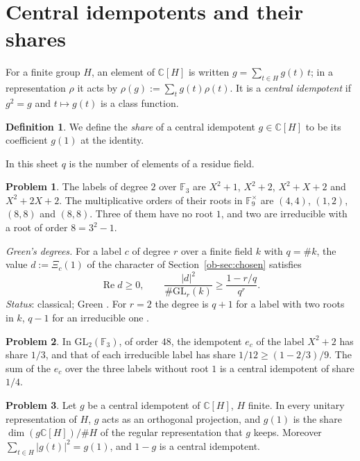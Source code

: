 \documentclass[reqno]{amsart}
\theoremstyle{plain}
\theoremstyle{definition}
\newtheorem{problem}{Problem}[section]
\newtheorem{definition}[theorem]{Definition}
\theoremstyle{remark}
\newcommand{\C}{\mathbb{C}}
\newcommand{\F}{\mathbb{F}}
\newcommand{\GL}{\mathrm{GL}}
\begin{document}
\section{Central idempotents and their shares}\label{sec:shares}

For a finite group \(H\), an element of \(\C[H]\) is written \(g = \sum_{t \in H} g(t)\,t\); in a representation \(\rho\) it acts by \(\rho(g) := \sum_t g(t)\rho(t)\).  It is a \emph{central idempotent} if \(g^2 = g\) and \(t \mapsto g(t)\) is a class function.

\begin{definition}\label{def:share}
We define the \emph{share} of a central idempotent \(g \in \C[H]\) to be its coefficient \(g(1)\) at the identity.
\end{definition}

In this sheet \(q\) is the number of elements of a residue field.

\begin{problem}\label{pr:labels}
The labels of degree \(2\) over \(\F_3\) are \(X^2+1\), \(X^2+2\), \(X^2+X+2\) and \(X^2+2X+2\).  The multiplicative orders of their roots in \(\F_9^\times\) are \((4,4)\), \((1,2)\), \((8,8)\) and \((8,8)\).  Three of them have no root \(1\), and two are irreducible with a root of order \(8 = 3^2-1\).
\end{problem}

\noindent\emph{Green's degrees.}  For a label \(c\) of degree \(r\) over a finite field \(k\) with \(q = \#k\), the value \(d := \Xi_c(1)\) of the character of Section~\ref{ob-sec:chosen} satisfies
\[
 \operatorname{Re} d \ge 0, \qquad \frac{\lvert d\rvert^2}{\#\GL_r(k)} \ge \frac{1 - r/q}{q^r} .
\]
\emph{Status}: classical; Green \cite[Thms.~12--14]{Gr}.  For \(r = 2\) the degree is \(q+1\) for a label with two roots in \(k\), \(q-1\) for an irreducible one \cite[\S5.2]{FH}.

\begin{problem}\label{pr:gl2-shares}
In \(\GL_2(\F_3)\), of order \(48\), the idempotent \(e_c\) of the label \(X^2+2\) has share \(1/3\), and that of each irreducible label has share \(1/12 \ge (1 - 2/3)/9\).  The sum of the \(e_c\) over the three labels without root \(1\) is a central idempotent of share \(1/4\).
\end{problem}

\begin{problem}\label{pr:central-proj}
Let \(g\) be a central idempotent of \(\C[H]\), \(H\) finite.  In every unitary representation of \(H\), \(g\) acts as an orthogonal projection, and \(g(1)\) is the share \(\dim(g\C[H])/\#H\) of the regular representation that \(g\) keeps.  Moreover \(\sum_{t \in H}\lvert g(t)\rvert^2 = g(1)\), and \(1 - g\) is a central idempotent.
\end{problem}
\end{document}
